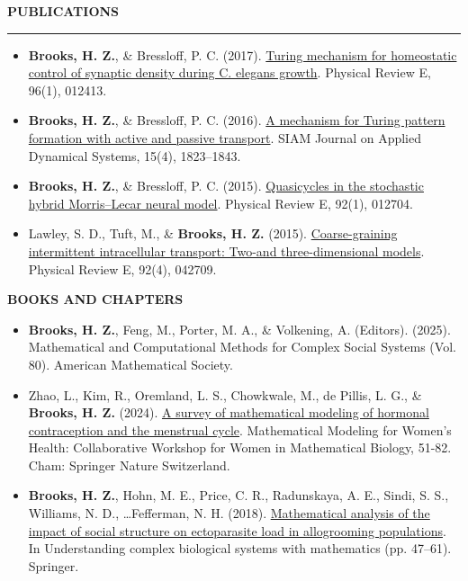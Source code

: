 \documentclass{resume} %
\renewenvironment{rSection}[1]{
\sectionskip
\textcolor{WinePurple}{\MakeUppercase{#1}}
\sectionlineskip
\hrule
\begin{list}{}{
\setlength{\leftmargin}{1.5em}
}
\item[]
}{
\end{list}
}
\begin{document}
\begin{rSection}{\bf Publications}
\begin{itemize}
    \item {\bf Brooks, H. Z.}, \& Bressloﬀ, P. C. (2017). \href{https://link.aps.org/pdf/10.1103/PhysRevE.96.012413}{Turing mechanism for homeostatic control of synaptic density
    during C. elegans growth}. Physical Review E, 96(1), 012413.

    \item {\bf Brooks, H. Z.}, \& Bressloﬀ, P. C. (2016). \href{https://epubs.siam.org/doi/pdf/10.1137/16M1061205}{A mechanism for Turing pattern formation with active and
    passive transport}. SIAM Journal on Applied Dynamical Systems, 15(4), 1823–1843.

    \item {\bf Brooks, H. Z.}, \& Bressloﬀ, P. C. (2015). \href{https://link.aps.org/pdf/10.1103/PhysRevE.92.012704}{Quasicycles in the stochastic hybrid Morris–Lecar neural model}.
    Physical Review E, 92(1), 012704.

    \item Lawley, S. D., Tuft, M., \& {\bf Brooks, H. Z.} (2015). \href{https://link.aps.org/pdf/10.1103/PhysRevE.92.042709}{Coarse-graining intermittent intracellular transport:
    Two-and three-dimensional models}. Physical Review E, 92(4), 042709.
\end{itemize}

\uppercase{{\bf Books and Chapters}}

\begin{itemize}
    \item {\bf Brooks, H. Z.}, Feng, M., Porter, M. A., \& Volkening, A. (Editors). (2025). Mathematical and Computational Methods for Complex Social Systems (Vol. 80). American Mathematical Society.

    \item Zhao, L., Kim, R., Oremland, L. S., Chowkwale, M., de Pillis, L. G., \& {\bf Brooks, H. Z.} (2024). \href{https://library.oapen.org/bitstream/handle/20.500.12657/92672/1/978-3-031-58516-6.pdf#page=55}{A survey of
    mathematical modeling of hormonal contraception and the menstrual cycle}. 
    Mathematical Modeling for Women’s Health: Collaborative Workshop for Women in Mathematical Biology, 51-82. Cham: Springer Nature Switzerland.

    \item {\bf Brooks, H. Z.}, Hohn, M. E., Price, C. R., Radunskaya, A. E., Sindi, S. S., Williams, N. D., \dots Feﬀerman, N. H. (2018). \href{https://link.springer.com/chapter/10.1007/978-3-319-98083-6_3}{Mathematical analysis of the impact of social structure on ectoparasite load in
    allogrooming populations}. In Understanding complex biological systems with mathematics (pp. 47–61).
    Springer.


\end{itemize}
\end{rSection}
\end{document}
